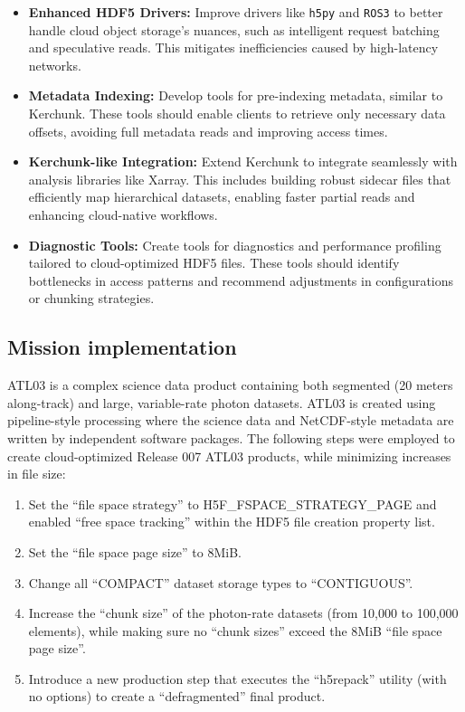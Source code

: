 \documentclass[
]{agujournal2019}
\providecommand{\tightlist}{%
  \setlength{\itemsep}{0pt}\setlength{\parskip}{0pt}}\usepackage{longtable,booktabs,array}
\begin{document}
\begin{itemize}
\tightlist
\item
  \textbf{Enhanced HDF5 Drivers:} Improve drivers like \texttt{h5py} and
  \texttt{ROS3} to better handle cloud object storage's nuances, such as
  intelligent request batching and speculative reads. This mitigates
  inefficiencies caused by high-latency networks.
\item
  \textbf{Metadata Indexing:} Develop tools for pre-indexing metadata,
  similar to Kerchunk. These tools should enable clients to retrieve
  only necessary data offsets, avoiding full metadata reads and
  improving access times.
\item
  \textbf{Kerchunk-like Integration:} Extend Kerchunk to integrate
  seamlessly with analysis libraries like Xarray. This includes building
  robust sidecar files that efficiently map hierarchical datasets,
  enabling faster partial reads and enhancing cloud-native workflows.
\item
  \textbf{Diagnostic Tools:} Create tools for diagnostics and
  performance profiling tailored to cloud-optimized HDF5 files. These
  tools should identify bottlenecks in access patterns and recommend
  adjustments in configurations or chunking strategies.
\end{itemize}

\subsection{Mission implementation}\label{mission-implementation}

ATL03 is a complex science data product containing both segmented (20
meters along-track) and large, variable-rate photon datasets. ATL03 is
created using pipeline-style processing where the science data and
NetCDF-style metadata are written by independent software packages. The
following steps were employed to create cloud-optimized Release 007
ATL03 products, while minimizing increases in file size:

\begin{enumerate}
\def\labelenumi{\arabic{enumi}.}
\tightlist
\item
  Set the ``file space strategy'' to H5F\_FSPACE\_STRATEGY\_PAGE and
  enabled ``free space tracking'' within the HDF5 file creation property
  list.
\item
  Set the ``file space page size'' to 8MiB.
\item
  Change all ``COMPACT'' dataset storage types to ``CONTIGUOUS''.
\item
  Increase the ``chunk size'' of the photon-rate datasets (from 10,000
  to 100,000 elements), while making sure no ``chunk sizes'' exceed the
  8MiB ``file space page size''.
\item
  Introduce a new production step that executes the ``h5repack'' utility
  (with no options) to create a ``defragmented'' final product.
\end{enumerate}
\end{document}
